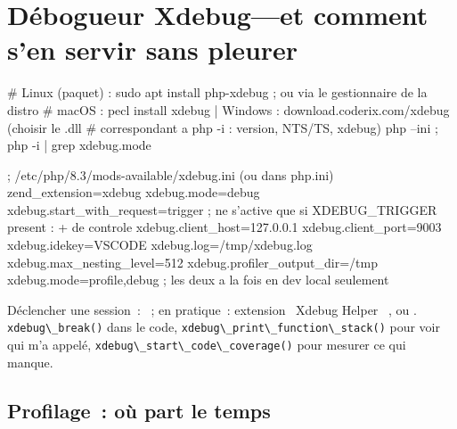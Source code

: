 \section{D\'ebogueur Xdebug---et comment s'en servir sans pleurer}

\begin{terminal}
# Linux (paquet) : sudo apt install php-xdebug ; ou via le gestionnaire de la distro
# macOS : pecl install xdebug  |  Windows : download.coderix.com/xdebug (choisir le .dll
#         correspondant a php -i : version, NTS/TS, xdebug)
php --ini ; php -i | grep xdebug.mode
\end{terminal}

\begin{codeconf}
; /etc/php/8.3/mods-available/xdebug.ini  (ou dans php.ini)
zend_extension=xdebug
xdebug.mode=debug
xdebug.start_with_request=trigger        ; ne s'active que si XDEBUG_TRIGGER present : + de controle
xdebug.client_host=127.0.0.1
xdebug.client_port=9003
xdebug.idekey=VSCODE
xdebug.log=/tmp/xdebug.log
xdebug.max_nesting_level=512
xdebug.profiler_output_dir=/tmp
xdebug.mode=profile,debug                 ; les deux a la fois en dev local seulement
\end{codeconf}


D\'eclencher une session~: ~; en pratique~: extension
\og ~Xdebug Helper~ \fg{}, ou .
\verb|xdebug\_break()| dans le code, \verb|xdebug\_print\_function\_stack()| pour voir qui m'a appel\'e,
\verb|xdebug\_start\_code\_coverage()| pour mesurer ce qui manque.

\subsection{Profilage~: o\`u part le temps}


